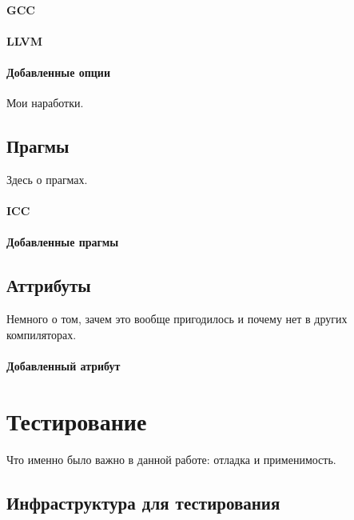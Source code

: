 \documentclass[12pt,a4paper]{article}
\begin{document}
\paragraph{GCC}

\paragraph{LLVM}

\paragraph{Добавленные опции}

Мои наработки.

\subsection{Прагмы}

Здесь о прагмах.

\paragraph{ICC}

\paragraph{Добавленные прагмы}

\subsection{Аттрибуты}

Немного о том, зачем это вообще пригодилось и почему нет в других компиляторах.

\paragraph{Добавленный атрибут}

\section{Тестирование}

Что именно было важно в данной работе: отладка и применимость.

\subsection{Инфраструктура для тестирования}
\end{document}
